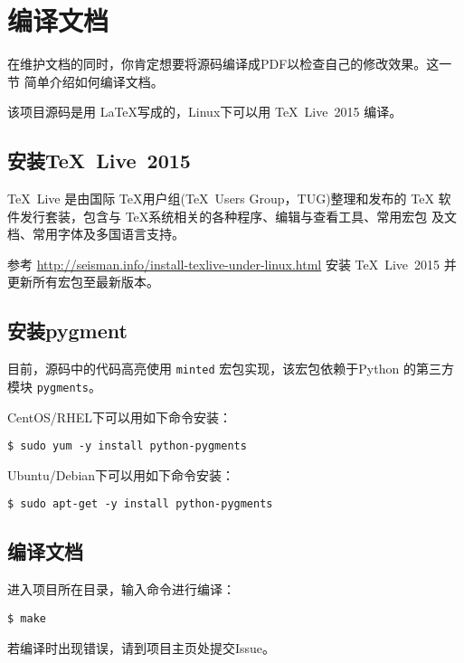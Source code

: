 \section{编译文档}
在维护文档的同时，你肯定想要将源码编译成PDF以检查自己的修改效果。这一节
简单介绍如何编译文档。

该项目源码是用 \LaTeX 写成的，Linux下可以用 \TeX~Live~2015 编译。

\subsection{安装\TeX~Live~2015}
\TeX~Live 是由国际 \TeX 用户组(\TeX~Users Group，TUG)整理和发布的 \TeX
软件发行套装，包含与 \TeX 系统相关的各种程序、编辑与查看工具、常用宏包
及文档、常用字体及多国语言支持。

参考 \url{http://seisman.info/install-texlive-under-linux.html} 安装
TeX~Live~2015 并更新所有宏包至最新版本。

\subsection{安装pygment}
目前，源码中的代码高亮使用 \texttt{minted} 宏包实现，该宏包依赖于Python
的第三方模块 \texttt{pygments}。

CentOS/RHEL下可以用如下命令安装：
\begin{verbatim}
$ sudo yum -y install python-pygments
\end{verbatim}

Ubuntu/Debian下可以用如下命令安装：
\begin{verbatim}
$ sudo apt-get -y install python-pygments
\end{verbatim}

\subsection{编译文档}
进入项目所在目录，输入命令进行编译：
\begin{verbatim}
$ make
\end{verbatim}
若编译时出现错误，请到项目主页处提交Issue。
